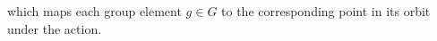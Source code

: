 \documentclass[12pt]{report}
\newcommand{\qft}{\mathsf{QFT}}
\begin{document}
which maps each group element \( g \in G \) to the corresponding point in its orbit under the action.


    
\end{document}
